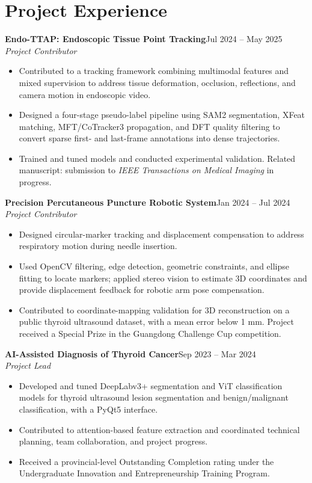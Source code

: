 \documentclass[a4paper,10pt]{article}
\begin{document}
\section{Project Experience}
\textbf{Endo-TTAP: Endoscopic Tissue Point Tracking}\hfill Jul 2024 -- May 2025\\
\textit{Project Contributor}
\begin{itemize}
\item Contributed to a tracking framework combining multimodal features and mixed supervision to address tissue deformation, occlusion, reflections, and camera motion in endoscopic video.
\item Designed a four-stage pseudo-label pipeline using SAM2 segmentation, XFeat matching, MFT/CoTracker3 propagation, and DFT quality filtering to convert sparse first- and last-frame annotations into dense trajectories.
\item Trained and tuned models and conducted experimental validation. Related manuscript: submission to \textit{IEEE Transactions on Medical Imaging} in progress.
\end{itemize}

\textbf{Precision Percutaneous Puncture Robotic System}\hfill Jan 2024 -- Jul 2024\\
\textit{Project Contributor}
\begin{itemize}
\item Designed circular-marker tracking and displacement compensation to address respiratory motion during needle insertion.
\item Used OpenCV filtering, edge detection, geometric constraints, and ellipse fitting to locate markers; applied stereo vision to estimate 3D coordinates and provide displacement feedback for robotic arm pose compensation.
\item Contributed to coordinate-mapping validation for 3D reconstruction on a public thyroid ultrasound dataset, with a mean error below 1 mm. Project received a Special Prize in the Guangdong Challenge Cup competition.
\end{itemize}

\textbf{AI-Assisted Diagnosis of Thyroid Cancer}\hfill Sep 2023 -- Mar 2024\\
\textit{Project Lead}
\begin{itemize}
\item Developed and tuned DeepLabv3+ segmentation and ViT classification models for thyroid ultrasound lesion segmentation and benign/malignant classification, with a PyQt5 interface.
\item Contributed to attention-based feature extraction and coordinated technical planning, team collaboration, and project progress.
\item Received a provincial-level Outstanding Completion rating under the Undergraduate Innovation and Entrepreneurship Training Program.
\end{itemize}
\end{document}
